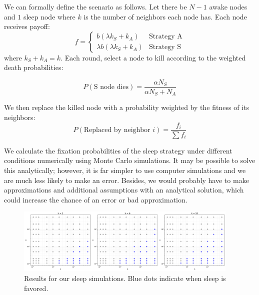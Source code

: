 \documentclass[11pt]{article}
\begin{document}
We can formally define the scenario as follows. Let there be $N - 1$ awake nodes and $1$ sleep node where $k$ is the number of neighbors each node has. Each node receives payoff:
\begin{equation}
f = 
\begin{cases}
    b(\lambda k_S + k_A) & \text{Strategy A} \\
    \lambda b(\lambda k_S + k_A) & \text{Strategy S}
\end{cases}
\end{equation}
where $k_S + k_A = k$. Each round, select a node to kill according to the weighted death probabilities:

\begin{equation}
    P(\text{S node dies}) = \frac{\alpha N_S}{\alpha N_S + N_A}
\end{equation}

We then replace the killed node with a probability weighted by the fitness of its neighbors:
\begin{equation}
    P(\text{Replaced by neighbor $i$}) = \frac{f_i}{\sum f_i}
\end{equation}

We calculate the fixation probabilities of the sleep strategy under different conditions numerically using Monte Carlo simulations. It may be possible to solve this analytically; however, it is far simpler to use computer simulations and we are much less likely to make an error. Besides, we would probably have to make approximations and additional assumptions with an analytical solution, which could increase the chance of an error or bad approximation. 

\begin{figure}[htbp]
    \centering    \includegraphics[width=0.95\textwidth]{figures/sleep-results.png}
    \caption{Results for our sleep simulations. Blue dots indicate when sleep is favored.}
    \label{fig:sleep-results}
\end{figure}
\end{document}
